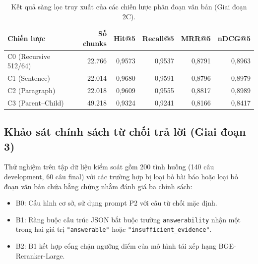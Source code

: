 \begin{table}[H]
  \centering
  \caption{Kết quả sàng lọc truy xuất của các chiến lược phân đoạn văn bản (Giai đoạn 2C).}
  \label{tab:appendix-phase2c}
  \small
  \begin{tabular}{lrrrrr}
    \toprule
    \textbf{Chiến lược} & \textbf{Số chunks} & \textbf{Hit@5} & \textbf{Recall@5} & \textbf{MRR@5} & \textbf{nDCG@5} \\
    \midrule
    C0 (Recursive 512/64) & 22.766 & 0,9573 & 0,9537 & 0,8791 & 0,8963 \\
    C1 (Sentence)         & 22.014 & 0,9680 & 0,9591 & 0,8796 & 0,8979 \\
    C2 (Paragraph)        & 22.018 & 0,9609 & 0,9555 & 0,8817 & 0,8989 \\
    C3 (Parent--Child)    & 49.218 & 0,9324 & 0,9241 & 0,8166 & 0,8417 \\
    \bottomrule
  \end{tabular}
\end{table}

\subsection{Khảo sát chính sách từ chối trả lời (Giai đoạn 3)}
Thử nghiệm trên tập dữ liệu kiểm soát gồm 200 tình huống (140 câu development, 60 câu final) với các trường hợp bị loại bỏ bài báo hoặc loại bỏ đoạn văn bản chứa bằng chứng nhằm đánh giá ba chính sách:
\begin{itemize}
  \item B0: Cấu hình cơ sở, sử dụng prompt P2 với câu từ chối mặc định.
  \item B1: Ràng buộc cấu trúc JSON bắt buộc trường \texttt{answerability} nhận một trong hai giá trị \texttt{"answerable"} hoặc \texttt{"insufficient\_evidence"}.
  \item B2: B1 kết hợp cổng chặn ngưỡng điểm của mô hình tái xếp hạng BGE-Reranker-Large.
\end{itemize}

